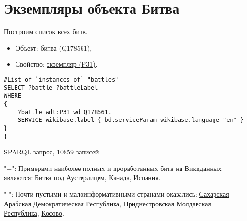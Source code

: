 \section{Экземпляры объекта Битва}

Построим список всех битв.

\begin{itemize}
    \item Объект: \href{https://www.wikidata.org/wiki/Q178561}{битва (Q178561)},
    \item Свойство: \href{https://www.wikidata.org/wiki/Property:P31}{экземпляр (P31)}.
\end{itemize}

\begin{lstlisting}[language=SPARQL]
#List of `instances of` "battles" 
SELECT ?battle ?battleLabel
WHERE
{
    ?battle wdt:P31 wd:Q178561.
    SERVICE wikibase:label { bd:serviceParam wikibase:language "en" }
}
}

\end{lstlisting}

\href{https://query.wikidata.org/#%23added%202017-02%0A%23List%20of%20%60instances%20of%60%20%22national%20park%22%20%0ASELECT%20%3Fbattle%20%3FbattleLabel%0AWHERE%0A%7B%0A%20%20%20%20%3Fbattle%20wdt%3AP31%20wd%3AQ178561.%0A%20%20%20%20SERVICE%20wikibase%3Alabel%20%7B%20bd%3AserviceParam%20wikibase%3Alanguage%20%22en%22%20%7D%0A%7D}{SPARQL-запрос}, 10859 записей

"+": Примерами наиболее полных и проработанных битв на Викиданных являются:
\href{https://www.wikidata.org/wiki/Q134114}{Битва под Аустерлицем}, 
\href{https://www.wikidata.org/wiki/Q38789}{Канада},
\href{https://www.wikidata.org/wiki/Q29}{Испания}.

"-": Почти пустыми и малоинформативными странами оказались:
\href{https://www.wikidata.org/wiki/Q40362}{Сахарская Арабская Демократическая Республика},
\href{https://www.wikidata.org/wiki/Q907112}{Приднестровская Молдавская Республика},
\href{https://www.wikidata.org/wiki/Q1246}{Косово}.